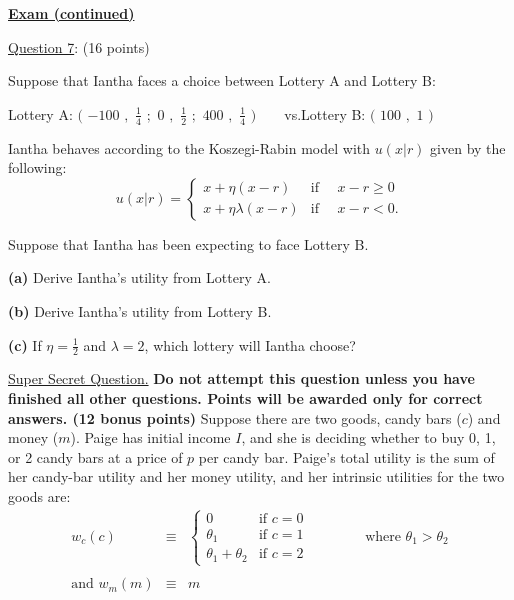 \documentclass[12pt]{article}
\theoremstyle{definition}
\begin{document}
\vspace*{0.4in}

\pagebreak

\begin{center}
\underline{\textbf{Exam (continued)}}
\end{center}

\vspace*{0.4in}

\underline{Question 7}: (16 points)

Suppose that Iantha faces a choice between Lottery A and Lottery B:

\begin{center}
Lottery A: $($ $-100$ $,$ $\frac{1}{4}$ $;$ $0$ $,$ $\frac{1}{2}$ $;$ $400$ $%
,$ $\frac{1}{4}$ $)\qquad $vs.\qquad Lottery B: $($ $100$ $,$ $1$ $)$
\end{center}

Iantha behaves according to the Koszegi-Rabin model with $u(x | r)$ given by the following:%
\[
u (x | r)=\left\{ 
\begin{array}{cc}
x +  \eta (x - r) & \text{if }\quad x - r\geq 0 \\ 
x + \eta \lambda (x - r) & \text{if }\quad x-r < 0.%
\end{array}%
\right. 
\]

Suppose that Iantha has been expecting to face Lottery B.

\textbf{(a)} Derive Iantha's utility from Lottery A.

\textbf{(b)} Derive Iantha's utility from Lottery B.

\textbf{(c)} If $\eta =\frac{1}{2}$ and $\lambda =2$, which lottery will
Iantha choose?

\pagebreak

\noindent \underline{Super Secret Question.} \textbf{Do not attempt this question unless you have finished all other questions. Points will be awarded only for correct answers. (12 bonus points)} 
Suppose there are two goods, candy bars ($c$) and money ($m$). Paige has
initial income $I$, and she is deciding whether to buy 0, 1, or 2 candy bars
at a price of $p$ per candy bar. Paige's total utility is the sum of her
candy-bar utility and her money utility, and her intrinsic utilities for the
two goods are:%
\begin{eqnarray*}
	w_{c}(c) &\equiv &\left\{ 
	\begin{array}{cc}
		0 & \text{if }c=0 \\ 
		\theta _{1} & \text{if }c=1 \\ 
		\theta _{1}+\theta _{2} & \text{if }c=2%
	\end{array}%
	\right. \qquad \qquad \text{where }\theta _{1}>\theta _{2} \\
	&& \\
	\text{and }w_{m}(m) &\equiv &m
\end{eqnarray*}
\end{document}
